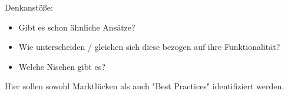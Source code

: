 Denkanstöße:
\begin{itemize}
\item Gibt es schon ähnliche Ansätze?
\item Wie unterscheiden / gleichen sich diese bezogen auf ihre Funktionalität?
\item Welche Nischen gibt es?
\end{itemize}
Hier sollen sowohl Marktlücken als auch "Best Practices" identifiziert werden.
\nsecend